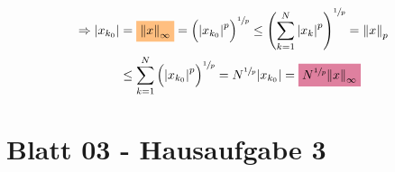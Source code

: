 \documentclass{scrreprt}
\begin{document}
\begin{enumerate}[a)]
    \begin{align*}
      \Rightarrow \abs{x_{k_0}}
        &= \colorbox{orange!50}{$\norm{x}_{\infty}$} = \qty\Big(\abs{x_{k_0}}^p)^{\sfrac{1}{p}}
          \leq \qty(\sum_{k = 1}^N \abs{x_k}^p)^{\sfrac{1}{p}} = \norm{x}_p \\
        &\leq \sum_{k = 1}^N \qty\Big(\abs{x_{k_0}}^p)^{\sfrac{1}{p}}
          = N^{\sfrac{1}{p}} \abs{x_{k_0}} =\colorbox{purple!50}{$N^{\sfrac{1}{p}} \norm{x}_{\infty}$}
    \end{align*}

  \end{enumerate}

\section{Blatt 03 - Hausaufgabe 3}
\end{document}
